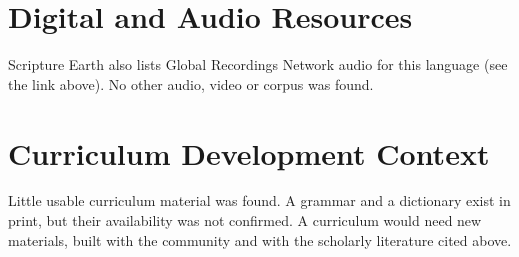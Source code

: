 \documentclass[12pt]{article}
\begin{document}
\section{Digital and Audio Resources}
Scripture Earth also lists Global Recordings Network audio for this language (see the link above). No other audio, video or corpus was found.

\section{Curriculum Development Context}
Little usable curriculum material was found. A grammar and a dictionary exist in print, but their availability was not confirmed. A curriculum would need new materials, built with the community and with the scholarly literature cited above.
\end{document}

